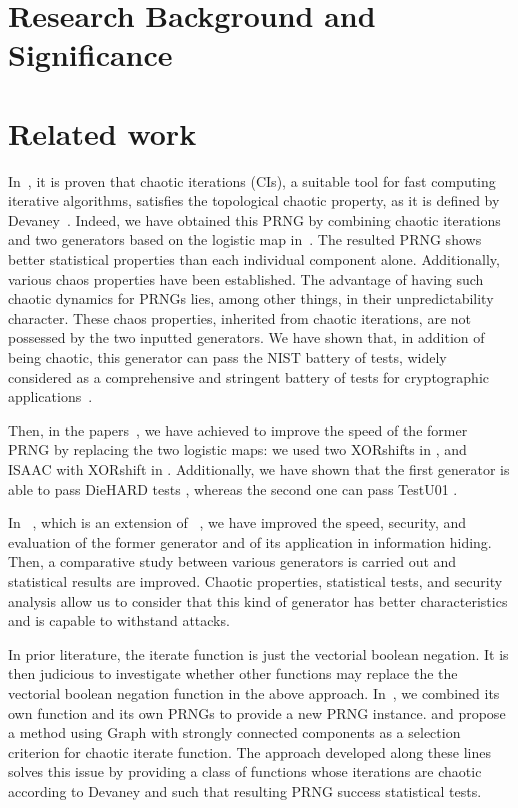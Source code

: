 \section{Research Background and Significance}


\section{Related work}
In~\cite{guyeux09,guyeux10}, it is proven that chaotic iterations (CIs), a suitable tool for fast computing iterative algorithms, satisfies the topological chaotic property, as it is defined by Devaney~\cite{Dev89}.
Indeed, we have obtained this PRNG by combining chaotic iterations and two generators based on the logistic map in~\cite{wang2009}.
The resulted PRNG shows better statistical properties than each individual component alone.
Additionally, various chaos properties have been established. 
The advantage of having such chaotic dynamics for PRNGs lies, among other things, in their unpredictability character.
These chaos properties, inherited from chaotic iterations, are not possessed by the two inputted generators.
We have shown that, in addition of being chaotic, this generator can pass the NIST battery of tests, widely considered as a comprehensive and stringent battery of tests for cryptographic applications~\cite{ANDREW2008}.

Then, in the papers~\cite{guyeuxTaiwan10,bgw10:ip}, we have achieved to improve the speed of the former PRNG by replacing the two logistic maps: we used two XORshifts in \cite{guyeuxTaiwan10}, and ISAAC with XORshift in \cite{bgw10:ip}. 
Additionally, we have shown that the first generator is able to pass DieHARD tests \cite{guyeuxTaiwan10}, whereas the second one can pass TestU01 \cite{bgw10:ip}.

In ~\cite{wbg10:ip,bfgw11:ij}, which is an extension of ~\cite{wang2009}, we have improved the speed, security, and evaluation of the former generator and of its application in information hiding. Then, a comparative study between various
generators is carried out and statistical results are improved. Chaotic properties, statistical tests, and security analysis allow us to consider that this kind of generator has better characteristics and is capable to withstand attacks. 

In prior literature, the iterate function is just the vectorial boolean negation. 
It is then judicious to investigate whether other functions may replace the the vectorial boolean negation function in the above approach. In~\cite{bcgw11:ip}, we combined its own function and its
own PRNGs to provide a new PRNG instance. and propose a method using Graph with strongly connected components as a selection criterion for chaotic iterate function. The approach
developed along these lines solves this issue by providing
a class of functions whose iterations are chaotic according
to Devaney and such that resulting PRNG success statistical
tests.

